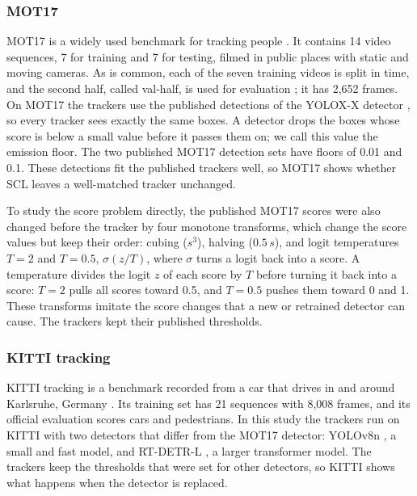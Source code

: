 \documentclass[pdflatex,sn-mathphys-num,iicol]{sn-jnl}
\newcommand{\scl}{SCL}
\begin{document}
\subsubsection{MOT17}
MOT17 is a widely used benchmark for tracking people \cite{milan2016mot16}. It contains 14 video
sequences, 7 for training and 7 for testing, filmed in public places with static and moving
cameras. As is common, each of the seven training videos is split in time, and the second half,
called val-half, is used for evaluation \cite{zhang2022bytetrack}; it has 2,652 frames. On MOT17
the trackers use the published detections of the YOLOX-X detector \cite{ge2021yolox}, so every
tracker sees exactly the same boxes. A detector drops the boxes whose score is below a small value
before it passes them on; we call this value the emission floor. The two published MOT17 detection
sets have floors of 0.01 and 0.1. These detections fit the published trackers well, so MOT17 shows
whether \scl{} leaves a well-matched tracker unchanged.

To study the score problem directly, the published MOT17 scores were also changed before the
tracker by four monotone transforms, which change the score values but keep their order: cubing
($s^3$), halving ($0.5\,s$), and logit temperatures $T=2$ and $T=0.5$, $\sigma(z/T)$, where
$\sigma$ turns a logit back into a score. A temperature divides the logit $z$ of each score by $T$
before turning it back into a score: $T=2$ pulls all scores toward 0.5, and $T=0.5$ pushes them
toward 0 and 1. These transforms imitate the score changes that a new or retrained detector can
cause. The trackers kept their published thresholds.

\subsubsection{KITTI tracking}
KITTI tracking is a benchmark recorded from a car that drives in and around Karlsruhe, Germany
\cite{geiger2012kitti}. Its training set has 21 sequences with 8,008 frames, and its official
evaluation scores cars and pedestrians. In this study the trackers run on KITTI with two detectors
that differ from the MOT17 detector: YOLOv8n \cite{jocher2023yolov8}, a small and fast model, and
RT-DETR-L \cite{zhao2024rtdetr}, a larger transformer model. The trackers keep the thresholds that
were set for other detectors, so KITTI shows what happens when the detector is replaced.
\end{document}
